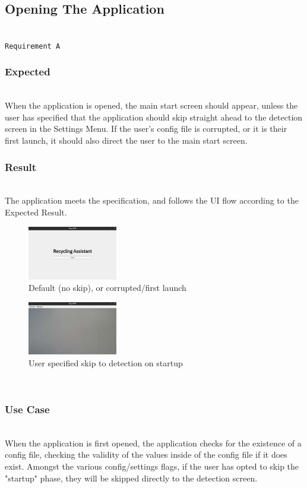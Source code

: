 \documentclass[conference]{IEEEtran}
\begin{document}
\subsection{Opening The Application}~\\
\texttt{Requirement A}~\\
\subsubsection{Expected}~\\
When the application is opened, the main start screen should appear, unless the user has specified that the application should skip straight ahead to the detection screen in the Settings Menu. If the user's config file is corrupted, or it is their first launch, it should also direct the user to the main start screen.~\\

\subsubsection{Result}~\\
The application meets the specification, and follows the UI flow according to the Expected Result.

\begin{figure}[!h]
    \centering
    \includegraphics[width=0.35\textwidth]{images/start.eps}
    \caption{Default (no skip), or corrupted/first launch}
\end{figure}

\begin{figure}[!h]
    \centering
    \includegraphics[width=0.35\textwidth]{images/nothing_detected.eps}
    \caption{User specified skip to detection on startup}
\end{figure}~\\

\subsubsection{Use Case}~\\
When the application is first opened, the application checks for the existence of a config file, checking the validity of the values inside of the config file if it does exist. Amongst the various config/settings flags, if the user has opted to skip the "startup" phase, they will be skipped directly to the detection screen.\\
\end{document}
